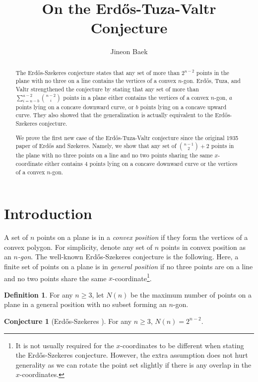 \documentclass{amsart}
\title[On the Erd\H{o}s-Tuza-Valtr Conjecture]{On the Erd\H{o}s-Tuza-Valtr Conjecture}
\author{Jineon Baek}
\theoremstyle{definition}
\newtheorem{definition}[thm]{Definition}
\newtheorem{conjecture}{Conjecture}
\numberwithin{thm}{section}
\begin{document}
\maketitle
\sloppy

\begin{abstract}

The Erd\H{o}s-Szekeres conjecture states that any set of more than $2^{n-2}$ points in the plane with no three on a line contains the vertices of a convex $n$-gon. 
Erd\H{o}s, Tuza, and Valtr strengthened the conjecture by stating that any set of more than $\sum_{i = n - b}^{a - 2} \binom{n - 2}{i}$ points in a plane either contains the vertices of a convex $n$-gon, $a$ points lying on a concave downward curve, or $b$ points lying on a concave upward curve.
They also showed that the generalization is actually equivalent to the Erd\H{o}s-Szekeres conjecture.

We prove the first new case of the Erd\H{o}s-Tuza-Valtr conjecture since the original 1935 paper of Erd\H{o}s and Szekeres. 
Namely, we show that any set of $\binom{n-1}{2} + 2$ points in the plane with no three points on a line and no two points sharing the same $x$-coordinate either contains 4 points lying on a concave downward curve or the vertices of a convex $n$-gon.
\end{abstract}

\section{Introduction}
A set of $n$ points on a plane is in a \emph{convex position} if they form the vertices of a convex polygon.
For simplicity, denote any set of $n$ points in convex position as an \emph{$n$-gon}.
The well-known Erd\H{o}s-Szekeres conjecture is the following.
Here, a finite set of points on a plane is in \emph{general position} if no three points are on a line and no two points share the same $x$-coordinate\footnote{It is not usually required for the $x$-coordinates to be different when stating the Erd\H{o}s-Szekeres conjecture. However, the extra assumption does not hurt generality as we can rotate the point set slightly if there is any overlap in the $x$-coordinates.}.

\begin{definition}
For any $n \geq 3$, let $N(n)$ be the maximum number of points on a plane in a general position with no subset forming an $n$-gon.
\end{definition}
\begin{conjecture}[Erd\H{o}s-Szekeres \cite{erd1960some}]
\label{conj:es}
For any $n \geq 3$, $N(n) = 2^{n-2}$.
\end{conjecture}
 
\end{document}
